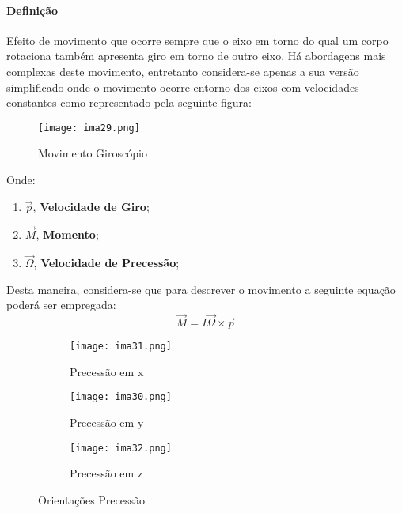 \documentclass{article}
\begin{document}
            \paragraph{Definição}Efeito de movimento que ocorre sempre que o eixo em torno do qual um corpo rotaciona também apresenta giro em torno de outro eixo. Há abordagens mais complexas deste movimento, entretanto considera-se apenas a sua versão simplificado onde o movimento ocorre entorno dos eixos com velocidades constantes como representado pela seguinte figura:
                \begin{figure}[H]
                    \centering
                    \texttt{[image: ima29.png]}
                    \caption{Movimento Giroscópio}
                \end{figure}\noindent
            Onde:
                \begin{enumerate}[rightmargin = \leftmargin, noitemsep]
                    \item $\vec{p}$, \textbf{Velocidade de Giro};
                    \item $\vec{M}$, \textbf{Momento};
                    \item $\vec{\Omega}$, \textbf{Velocidade de Precessão};
                \end{enumerate}
            Desta maneira, considera-se que para descrever o movimento a seguinte equação poderá ser empregada:
                \begin{equation}
                    \boxed{
                        \vec{M} = I \vec{\Omega}\times\vec{p}
                    }
                \end{equation}
                \begin{figure}[H]
                    \centering
                    \begin{subfigure}[t]{0.3\linewidth}
                        \centering
                        \texttt{[image: ima31.png]}
                        \caption{Precessão em x}
                    \end{subfigure}
                    \begin{subfigure}[t]{0.3\linewidth}
                        \centering
                        \texttt{[image: ima30.png]}
                        \caption{Precessão em y}
                    \end{subfigure}
                    \begin{subfigure}[t]{0.3\linewidth}
                        \centering
                        \texttt{[image: ima32.png]}
                        \caption{Precessão em z}
                    \end{subfigure}
                    \caption{Orientações Precessão}
                \end{figure}
\newpage
\end{document}
